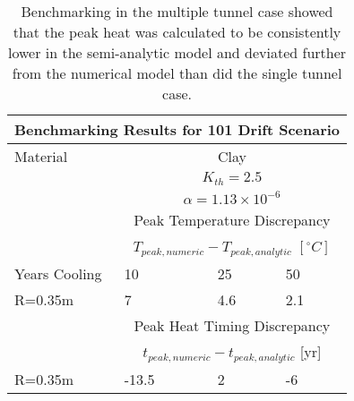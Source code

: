 \begin{table}
  \centering
  \begin{tabular}{|l|l|l|l|}
    \multicolumn{4}{c}{\textbf{Benchmarking Results for 101 Drift Scenario}}\\
    \hline
    Material & \multicolumn{3}{|c|}{Clay} \\
    & \multicolumn{3}{|c|}{$K_{th}=2.5$}\\ 
    & \multicolumn{3}{|c|}{$\alpha=1.13\times10^{-6}$}  \\
    \hline
    & \multicolumn{3}{|c|}{Peak Temperature Discrepancy} \\
    & \multicolumn{3}{|c|}{$T_{peak,numeric}-T_{peak,analytic}$ $[^{\circ}C]$} \\
    \hline
    Years Cooling  & 10  & 25 & 50 \\
    \hline
    R=0.35m   & 7 & 4.6 & 2.1 \\
    \hline
    &\multicolumn{3}{|c|}{Peak Heat Timing Discrepancy}\\
    &\multicolumn{3}{|c|}{ $t_{peak,numeric}-t_{peak,analytic}$ [yr]} \\
    \hline
    R=0.35m       & -13.5   & 2   & -6  \\
    \hline
  \end{tabular}
  \caption{Benchmarking in the multiple tunnel case showed that the peak heat was 
  calculated to be consistently lower in the semi-analytic model and deviated further
  from the numerical model than did the single tunnel case.
  }
  \label{tab:benchMulti}
\end{table}

\clearpage

